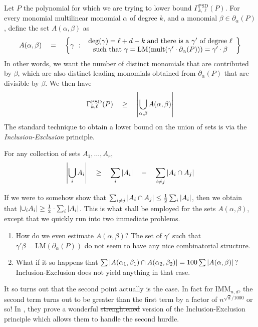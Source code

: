 \documentclass{beatcs}
\newcommand{\IMM}{\mathrm{IMM}}
\newcommand{\spaced}[1]{\quad#1\quad}
\providecommand{\DIFaddtex}[1]{{\protect\color{blue}\uwave{#1}}} %
\providecommand{\DIFdeltex}[1]{{\protect\color{red}\sout{#1}}}                      %
\providecommand{\DIFaddbegin}{} %
\providecommand{\DIFaddend}{} %
\providecommand{\DIFdelbegin}{} %
\providecommand{\DIFdelend}{} %
\providecommand{\DIFadd}[1]{\texorpdfstring{\DIFaddtex{#1}}{#1}} %
\providecommand{\DIFdel}[1]{\texorpdfstring{\DIFdeltex{#1}}{}} %
\begin{document}
Let $P$ the polynomial for which we are trying to lower bound $\Gamma^{\mathrm{PSD}}_{k,\ell}(P)$. For every monomial multilinear monomial $\alpha$ of degree $k$, and a monomial $\beta \in \partial_\alpha(P)$, define the set $A(\alpha, \beta)$ as
\[
A(\alpha, \beta) \spaced{=} \setdef{\gamma}{\begin{array}{c}\deg(\gamma) = \ell + d - k\;\text{and there is a $\gamma'$ of degree $\ell$}\\\text{such that }\gamma  = \mathrm{LM}(\mathrm{mult}(\gamma' \cdot \partial_\alpha(P))) = \gamma' \cdot \beta \end{array}}
\]
In other words, we want the number of distinct monomials that are contributed by $\beta$, which are also distinct leading monomials obtained from $\partial_\alpha(P)$ that are divisible by $\beta$. We then have
\begin{equation}\label{eqn:union-of-As}
\Gamma^{\mathrm{PSD}}_{k,\ell}(P) \spaced{\geq} \abs{\Union_{\alpha, \beta} A(\alpha, \beta)}
\end{equation}
The standard technique to obtain a lower bound on the union of sets is via the \emph{Inclusion-Exclusion} principle. 

\begin{lemma}\label{lem:inc-exc}
For any collection of sets $A_1,\dots, A_r$,
\[
\abs{\Union_i A_i} \spaced{\geq} \sum_{i} \abs{A_i} \spaced{-} \sum_{i\neq j}\abs{A_i\intersection A_j}
\]
\end{lemma}

If we were to somehow show that $\sum_{i\neq j}\left|A_i\cap A_j\right| \leq \frac{1}{2}\sum_i \left|A_i\right|$, then we obtain that $\left|\cup_i A_i\right| \geq \frac{1}{2}\cdot \sum_i \left|A_i\right|$. This is what shall be employed for the sets $A(\alpha, \beta)$, except that we quickly run into two immediate problems. 

\begin{enumerate}
  \item How do we even estimate $A(\alpha, \beta)$? The set of $\gamma'$ such that $\gamma' \beta = \mathrm{LM}(\partial_\alpha(P))$ do not seem to have any nice combinatorial structure. 
  \item What if it so happens that $\sum \left|A(\alpha_1,\beta_1)\cap A(\alpha_2,\beta_2)\right| = 100 \sum \left|A(\alpha,\beta)\right|$? Inclusion-Exclusion does not yield anything in that case. 
\end{enumerate}


It so turns out that the second point actually is the case. In fact for $\IMM_{n,d}$, the second term turns out to be greater than the first term by a factor of $n^{\sqrt{d}/1000}$ or so! In \cite{KS14}, they prove a wonderful \DIFdelbegin \DIFdel{strenghtened }\DIFdelend \DIFaddbegin \DIFadd{strengthened }\DIFaddend version of the Inclusion-Exclusion principle which allows them to handle the second hurdle. 
\end{document}
